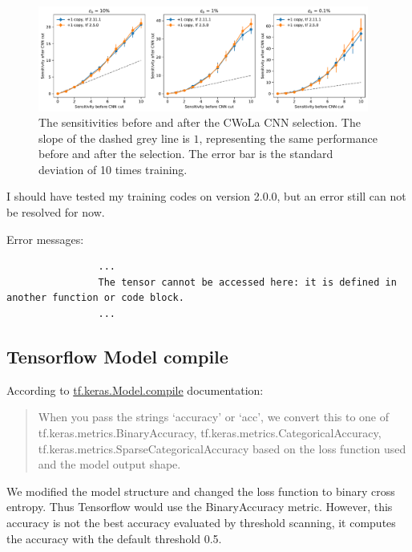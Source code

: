 \documentclass[12pt]{article}
\begin{document}
			\begin{figure}[htpb]
				\centering
				\includegraphics[width=0.97\textwidth]{HVmodel_sensitivity_improvement_bkg_eff_copy_1_tf_250.pdf}
				\caption{The sensitivities before and after the CWoLa CNN selection. The slope of the dashed grey line is $1$, representing the same performance before and after the selection. The error bar is the standard deviation of 10 times training.}
				\label{fig:sensitivity_improvement_bkg_eff_tf_250}
			\end{figure} 

			I should have tested my training codes on version 2.0.0, but an error still can not be resolved for now.

			Error messages:
			\begin{verbatim}
				...
				The tensor cannot be accessed here: it is defined in another function or code block. 
				...
			\end{verbatim}
	\subsection{Tensorflow Model compile}%
	\label{sub:tensorflow_model_compile}
		According to \href{https://www.tensorflow.org/api_docs/python/tf/keras/Model#compile}{tf.keras.Model.compile} documentation:
		\begin{quote}
			When you pass the strings `accuracy' or `acc', we convert this to one of \newline tf.keras.metrics.BinaryAccuracy, tf.keras.metrics.CategoricalAccuracy, \newline tf.keras.metrics.SparseCategoricalAccuracy based on the loss function used and the model output shape.
		\end{quote}
		We modified the model structure and changed the loss function to binary cross entropy. Thus Tensorflow would use the BinaryAccuracy metric. However, this accuracy is not the best accuracy evaluated by threshold scanning, it computes the accuracy with the default threshold 0.5.
\end{document}
